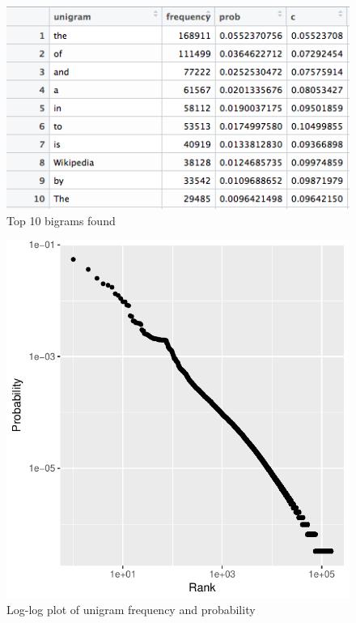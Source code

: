 \documentclass[letterpaper,11pt]{article}
\begin{document}
  \begin{figure}[h]
  \centering
  \includegraphics[scale=0.6]{bigram_10.png}
  \caption{Top 10 bigrams found}
  \label{fig:q1bi}
  \end{figure}
  
   \begin{figure}[h]
  \centering
  \includegraphics[scale=0.6]{unigram_plot.pdf}
  \caption{Log-log plot of unigram frequency and probability}
  \label{fig:q1p1}
  \end{figure}
\end{document}
